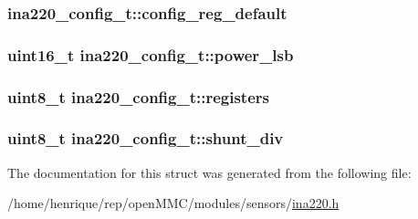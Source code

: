\hypertarget{structina220__config__t_acbce4303801a7e0c5852beb3bfc54f70}{
\subsubsection[{config\-\_\-reg\-\_\-default}]{ ina220\-\_\-config\-\_\-t\-::config\-\_\-reg\-\_\-default}}\label{structina220__config__t_acbce4303801a7e0c5852beb3bfc54f70}
\hypertarget{structina220__config__t_a2e8bd312fafd0e208ffe39dff1ae7071}{
\subsubsection[{power\-\_\-lsb}]{\setlength{\rightskip}{0pt plus 5cm}uint16\-\_\-t ina220\-\_\-config\-\_\-t\-::power\-\_\-lsb}}\label{structina220__config__t_a2e8bd312fafd0e208ffe39dff1ae7071}
\hypertarget{structina220__config__t_a4533b3b8b7676acceda9ffb54a82e946}{
\subsubsection[{registers}]{\setlength{\rightskip}{0pt plus 5cm}uint8\-\_\-t ina220\-\_\-config\-\_\-t\-::registers}}\label{structina220__config__t_a4533b3b8b7676acceda9ffb54a82e946}
\hypertarget{structina220__config__t_ae5d9fa3cdaec6362d0dc70c88c45b0e0}{
\subsubsection[{shunt\-\_\-div}]{\setlength{\rightskip}{0pt plus 5cm}uint8\-\_\-t ina220\-\_\-config\-\_\-t\-::shunt\-\_\-div}}\label{structina220__config__t_ae5d9fa3cdaec6362d0dc70c88c45b0e0}


The documentation for this struct was generated from the following file\-:\begin{DoxyCompactItemize}
\item 
/home/henrique/rep/open\-M\-M\-C/modules/sensors/\hyperlink{ina220_8h}{ina220.\-h}\end{DoxyCompactItemize}
